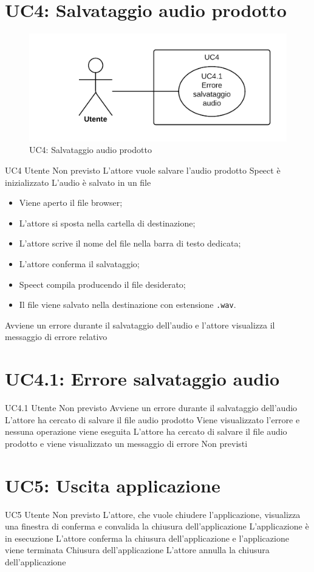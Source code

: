 \documentclass[../AnalisideiRequisiti.tex]{subfiles}
\begin{document}
\section{UC4: Salvataggio audio prodotto}
\begin{figure}[H]
	\centering
	\includegraphics[width=\textwidth]{../img/UC4.png}
	\caption{UC4: Salvataggio audio prodotto}
\end{figure}
\UserCase
{UC4}
{Utente}
{Non previsto}
{L'attore vuole salvare l'audio prodotto}
{Speect è inizializzato }
{L'audio è salvato in un file}
{
		\begin{itemize}
		\item{} Viene aperto il file browser;
		\item{} L'attore si sposta nella cartella di destinazione;
		\item{} L'attore scrive il nome del file nella barra di testo dedicata;
		\item{} L'attore conferma il salvataggio;
		\item{} Speect compila producendo il file desiderato;
		\item{} Il file viene salvato nella destinazione con estensione \verb|.wav|.
		\end{itemize}
}
{Avviene un errore durante il salvataggio dell'audio e l'attore visualizza il messaggio di errore relativo }
		
\section{UC4.1: Errore salvataggio audio}
\UserCase
{UC4.1}
{Utente}
{Non previsto}
{Avviene un errore durante il salvataggio dell'audio}
{L'attore ha cercato di salvare il file audio prodotto} 
{Viene visualizzato l'errore e nessuna operazione viene eseguita}
{L'attore ha cercato di salvare il file audio prodotto e viene visualizzato un messaggio di errore}
{Non previsti}

\section{UC5: Uscita applicazione}
\UserCase
{UC5}
{Utente}
{Non previsto}
{L'attore, che vuole chiudere l'applicazione, visualizza una finestra di conferma e convalida la chiusura dell'applicazione}
{L'applicazione è in esecuzione}
{L'attore conferma la chiusura dell'applicazione e l'applicazione viene terminata}
{Chiusura dell'applicazione}
{L'attore annulla la chiusura dell'applicazione}
\end{document}
